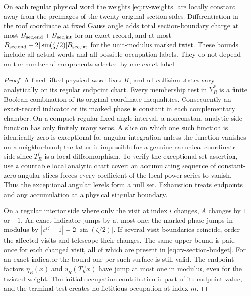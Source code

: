 \begin{lemma}
\label{lem:rv-jumps}
On each regular physical word the weights
\eqref{eq:rv-weights} are locally constant away from the preimages
of the twenty original section sides. Differentiation in the roof
coordinate at fixed Gauss angle adds total section-boundary charge
at most $B_{\rm sec,end}+B_{\rm sec,int}$ for an exact record,
and at most
$B_{\rm sec,end}+2|\sin(\zeta/2)|B_{\rm sec,int}$ for the
unit-modulus marked twist. These bounds include all actual words
and all possible occupation labels. They do not depend on the
number of components selected by one exact label.
\end{lemma}
\begin{proof}
A fixed lifted physical word fixes $K$, and all collision states
vary analytically on its regular endpoint chart. Every membership
test in $Y_R^*$ is a finite Boolean combination of its original
coordinate inequalities. Consequently an exact-record indicator
or its marked phase is constant in each complementary chamber.
On a compact regular fixed-angle interval, a nonconstant analytic
side function has only finitely many zeros. A slice on which one
such function is identically zero is exceptional for angular
integration unless the function vanishes on a neighborhood; the
latter is impossible for a genuine canonical coordinate side since
$T_R^i$ is a local diffeomorphism. To verify the exceptional-set
assertion, use a countable local analytic chart cover: an accumulating
sequence of constant-zero angular slices forces every coefficient
of the local power series to vanish. Thus the exceptional angular
levels form a null set. Exhaustion treats endpoints and any
accumulation at a physical singular boundary.

On a regular interior side where only the visit at index $i$ changes,
$A$ changes by $1$ or $-1$. An exact indicator jumps by at most one;
the marked phase jumps in modulus by
$|e^{i\zeta}-1|=2|\sin(\zeta/2)|$. If several visit boundaries
coincide, order the affected visits and telescope their changes.
The same upper bound is paid once for each changed visit, all of
which are present in \eqref{eq:rv-section-budget}. For an exact
indicator the bound one per such surface is still valid. The
endpoint factors $\eta_R(x)$ and $\eta_R(T_R^mx)$ have jump
at most one in modulus, even for the twisted weight. The initial
occupation contribution is part of its endpoint value, and the
terminal test creates no fictitious occupation at index $m$.


\end{proof}
